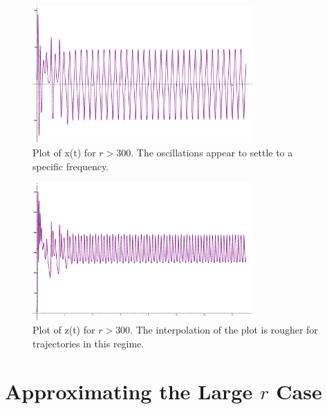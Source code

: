 \documentclass{report}
\begin{document}
\begin{figure}[ht]
  \centering
  \includegraphics[width=0.75\textwidth]{purplex.eps}
  \caption{Plot of x(t) for \(r > 300\). The oscillations appear to settle
to a specific frequency.}
  \label{fig:bigr-x}
\end{figure}

\begin{figure}[ht]
  \centering
  \includegraphics[width=0.75\textwidth]{purplez.eps}
  \caption{Plot of z(t) for \(r > 300\). The interpolation of the plot is
rougher for trajectories in this regime.}
  \label{fig:bigr-z}
\end{figure}

\section{Approximating the Large \(r\) Case}
\end{document}

